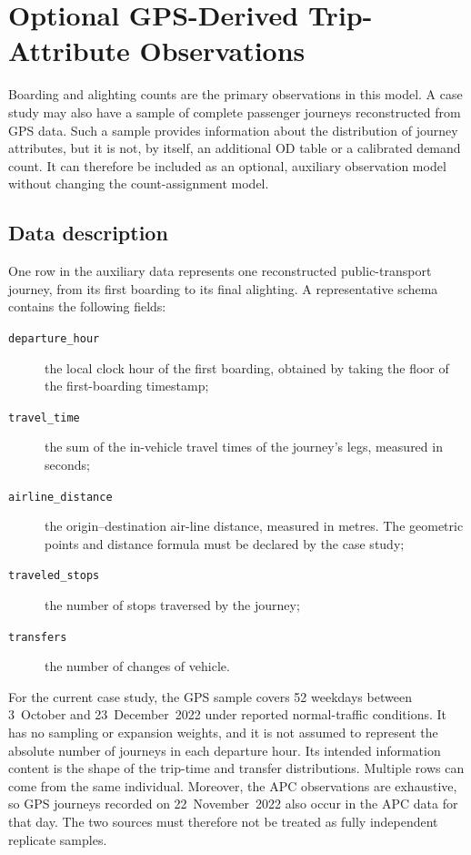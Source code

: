 \section{Optional GPS-Derived Trip-Attribute Observations}
\label{sec:gps-trip-attribute-observations}

Boarding and alighting counts are the primary observations in this model.  A
case study may also have a sample of complete passenger journeys reconstructed
from GPS data.  Such a sample provides information about the distribution of
journey attributes, but it is not, by itself, an additional OD table or a
calibrated demand count.  It can therefore be included as an optional,
auxiliary observation model without changing the count-assignment model.

\subsection{Data description}

One row in the auxiliary data represents one reconstructed public-transport
journey, from its first boarding to its final alighting.  A representative
schema contains the following fields:

\begin{description}
  \item[\texttt{departure\_hour}] the local clock hour of the first boarding,
    obtained by taking the floor of the first-boarding timestamp;
  \item[\texttt{travel\_time}] the sum of the in-vehicle travel times of the
    journey's legs, measured in seconds;
  \item[\texttt{airline\_distance}] the origin--destination air-line distance,
    measured in metres.  The geometric points and distance formula must be
    declared by the case study;
  \item[\texttt{traveled\_stops}] the number of stops traversed by the
    journey;
  \item[\texttt{transfers}] the number of changes of vehicle.
\end{description}

For the current case study, the GPS sample covers 52 weekdays between
3~October and 23~December~2022 under reported normal-traffic conditions.  It
has no sampling or expansion weights, and it is not assumed to represent the
absolute number of journeys in each departure hour.  Its intended information
content is the shape of the trip-time and transfer distributions.  Multiple
rows can come from the same individual.  Moreover, the APC observations are
exhaustive, so GPS journeys recorded on 22~November~2022 also occur in the APC
data for that day.  The two sources must therefore not be treated as fully
independent replicate samples.

